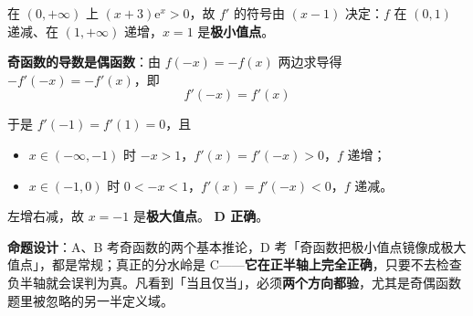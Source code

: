 \begin{answer}
在 $(0,+\infty)$ 上 $(x+3)\mathrm{e}^x>0$，故 $f'$ 的符号由 $(x-1)$ 决定：$f$ 在 $(0,1)$ 递减、在 $(1,+\infty)$ 递增，$x=1$ 是\textbf{极小值点}。

\textbf{奇函数的导数是偶函数}：由 $f(-x)=-f(x)$ 两边求导得 $-f'(-x)=-f'(x)$，即
\nopagebreak[4]
\[f'(-x)=f'(x)\]

于是 $f'(-1)=f'(1)=0$，且
\begin{itemize}
\item $x\in(-\infty,-1)$ 时 $-x>1$，$f'(x)=f'(-x)>0$，$f$ 递增；
\item $x\in(-1,0)$ 时 $0<-x<1$，$f'(x)=f'(-x)<0$，$f$ 递减。
\end{itemize}

左增右减，故 $x=-1$ 是\textbf{极大值点}。 \textbf{D 正确}。

\begin{gktip}
\textbf{命题设计}：A、B 考奇函数的两个基本推论，D 考「奇函数把极小值点镜像成极大值点」，都是常规；真正的分水岭是 C——\textbf{它在正半轴上完全正确}，只要不去检查负半轴就会误判为真。凡看到「当且仅当」，必须\textbf{两个方向都验}，尤其是奇偶函数题里被忽略的另一半定义域。
\end{gktip}


\par\medskip

\end{answer}
